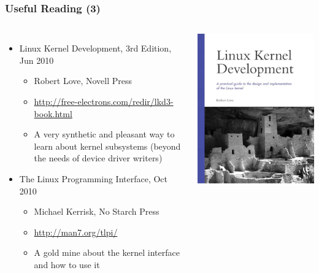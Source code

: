 \begin{frame}
  \frametitle{Useful Reading (3)}
  \begin{columns}
    \begin{itemize}
    \item Linux Kernel Development, 3rd Edition, Jun 2010
      \begin{itemize}
      \item Robert Love, Novell Press
      \item \url{http://free-electrons.com/redir/lkd3-book.html}
      \item A very synthetic and pleasant way to learn about kernel
        subsystems (beyond the needs of device driver writers)
      \end{itemize}
    \item The Linux Programming Interface, Oct 2010
      \begin{itemize}
      \item Michael Kerrisk, No Starch Press
      \item \url{http://man7.org/tlpi/}
      \item A gold mine about the kernel interface and how to use it
      \end{itemize}
    \end{itemize}
    \begin{center}
      \includegraphics[height=0.4\textheight]{slides/kernel-resources-references/linux-kernel-development.jpg}\\

\end{center}
\end{columns}
\end{frame}

